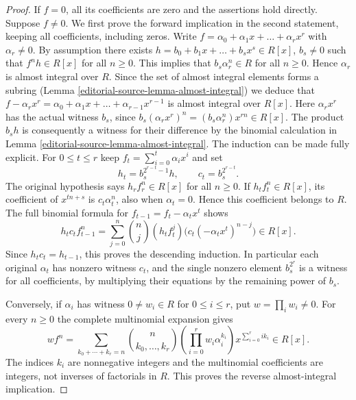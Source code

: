 \begin{proof}
If $f=0$, all its coefficients are zero and the assertions hold
directly. Suppose $f\ne0$. We first prove the forward implication
in the second statement, keeping all coefficients, including zeros.
Write $f = \alpha_0 + \alpha_1 x + \ldots + \alpha_r x^r$
with $\alpha_r \not = 0$.
By assumption there exists $h = b_0 + b_1 x + \ldots + b_s x^s \in R[x]$,
$b_s \not = 0$ such that $f^n h \in R[x]$ for all
$n \geq 0$. This implies that $b_s \alpha_r^n \in R$
for all $n \geq 0$. Hence $\alpha_r$ is almost
integral over $R$. Since the set of almost integral
elements forms a subring (Lemma \ref{editorial-source-lemma-almost-integral}) we deduce that
$f - \alpha_r x^r = \alpha_0 + \alpha_1 x + \ldots + \alpha_{r - 1} x^{r - 1}$
is almost integral over $R[x]$. Here $\alpha_rx^r$ has the
actual witness $b_s$, since
$b_s(\alpha_rx^r)^n=(b_s\alpha_r^n)x^{rn}\in R[x]$.
The product $b_sh$ is consequently a witness for their difference
by the binomial calculation in Lemma \ref{editorial-source-lemma-almost-integral}.
The induction can be made fully explicit. For $0\leq t\leq r$
keep $f_t=\sum_{i=0}^t\alpha_ix^i$ and set
$$
h_t=b_s^{2^{r-t}-1}h,\qquad c_t=b_s^{2^{r-t}}.
$$
The original hypothesis says $h_rf_r^n\in R[x]$ for all $n\geq0$.
If $h_tf_t^n\in R[x]$, its coefficient of $x^{tn+s}$ is
$c_t\alpha_t^n$, also when $\alpha_t=0$. Hence this coefficient
belongs to $R$. The full binomial formula for
$f_{t-1}=f_t-\alpha_tx^t$ shows
$$
h_tc_t f_{t-1}^n
=\sum_{j=0}^n\binom nj(h_tf_t^j)
 \bigl(c_t(-\alpha_tx^t)^{n-j}\bigr)\in R[x].
$$
Since $h_tc_t=h_{t-1}$, this proves the descending induction.
In particular each original $\alpha_t$ has nonzero witness $c_t$,
and the single nonzero element $b_s^{2^r}$ is a witness for
all coefficients, by multiplying their equations by the remaining
power of $b_s$.

Conversely, if $\alpha_i$ has witness $0\ne w_i\in R$ for
$0\leq i\leq r$, put $w=\prod_iw_i\ne0$. For every $n\geq0$
the complete multinomial expansion gives
$$
w f^n=\sum_{k_0+\cdots+k_r=n}
\binom{n}{k_0,\ldots,k_r}
\left(\prod_{i=0}^r w_i\alpha_i^{k_i}\right)
x^{\sum_{i=0}^r i k_i}\in R[x].
$$
The indices $k_i$ are nonnegative integers and the multinomial
coefficients are integers, not inverses of factorials in $R$.
This proves the reverse almost-integral implication.


\end{proof}
